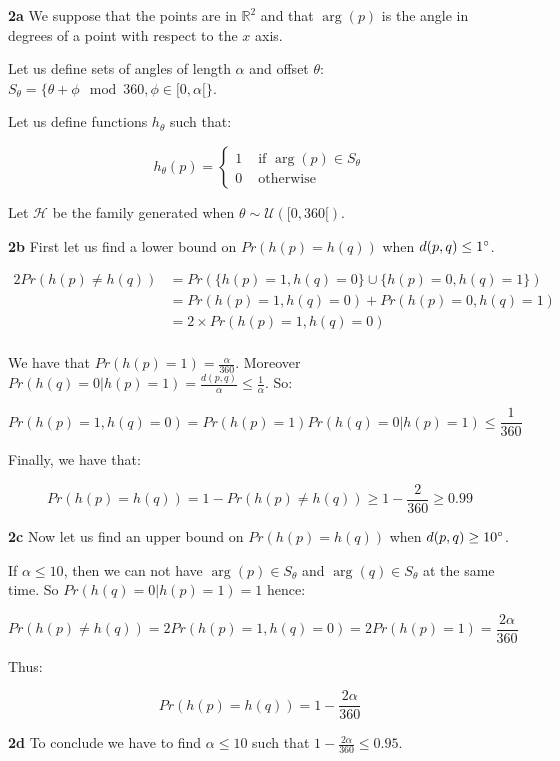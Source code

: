 \documentclass[10pt,a4paper]{article}
\theoremstyle{plain}
\begin{document}
\textbf{2a} We suppose that the points are in $\mathbb{R}^2$ and that $\arg(p)$ is the angle in degrees of a point with respect to the $x$ axis.

Let us define sets of angles of length $\alpha$ and offset $\theta$: $S_{\theta} = \{ \theta + \phi \mod 360, \phi \in [0, \alpha[ \}$.

Let us define functions $h_{\theta}$ such that:

$$
h_{\theta}(p) = \left\{\begin{array}{ll}
1 & \text{ if } \arg(p) \in S_{\theta} \\
0 & \text{ otherwise}
\end{array}\right.
$$

Let $\mathcal{H}$ be the family generated when $\theta \sim \mathcal{U}([0, 360[)$.

\textbf{2b} First let us find a lower bound on $Pr(h(p) = h(q))$ when $d(p, q) \leq 1\degree$.

\begin{alignat*}{2}
Pr(h(p) \neq h(q)) & = Pr(\{h(p) = 1, h(q) = 0\} \cup \{h(p) = 0, h(q) = 1\}) \\
& = Pr(h(p) = 1, h(q) = 0) + Pr(h(p) = 0, h(q) = 1) \\
& = 2 \times Pr(h(p) = 1, h(q) = 0) \\
\end{alignat*}

We have that $Pr(h(p) = 1) = \frac{\alpha}{360}$. Moreover $Pr(h(q) = 0 | h(p) = 1) = \frac{d(p, q)}{\alpha} \leq \frac{1}{\alpha}$. So:

$$
Pr(h(p) = 1, h(q) = 0) = Pr(h(p) = 1)Pr(h(q) = 0 | h(p) = 1)\leq \frac{1}{360}
$$

Finally, we have that:

$$
Pr(h(p) = h(q)) = 1 - Pr(h(p) \neq h(q)) \geq 1 - \frac{2}{360} \geq 0.99
$$

\textbf{2c} Now let us find an upper bound on $Pr(h(p) = h(q))$ when $d(p, q) \geq 10\degree$.

If $\alpha \leq 10$, then we can not have $\arg(p) \in S_{\theta}$ and $\arg(q) \in S_{\theta}$ at the same time. So $Pr(h(q) = 0 | h(p) = 1) = 1$ hence:

$$
Pr(h(p) \neq h(q)) = 2Pr(h(p) = 1, h(q) = 0) = 2Pr(h(p) = 1) = \frac{2\alpha}{360}
$$

Thus:

$$
Pr(h(p) = h(q)) = 1 - \frac{2\alpha}{360}
$$

\textbf{2d} To conclude we have to find $\alpha \leq 10$ such that $1 - \frac{2\alpha}{360} \leq 0.95$.
\end{document}
